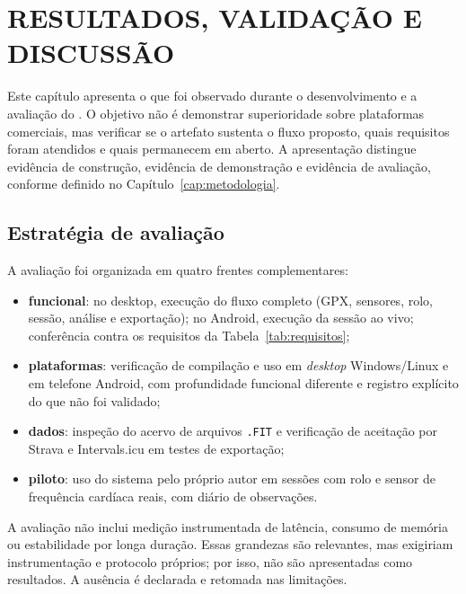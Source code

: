 
\chapter{RESULTADOS, VALIDAÇÃO E DISCUSSÃO}
\label{cap:resultados}

Este capítulo apresenta o que foi observado durante o desenvolvimento e a
avaliação do \argus{}. O objetivo não é demonstrar superioridade sobre
plataformas comerciais, mas verificar se o artefato sustenta o fluxo proposto,
quais requisitos foram atendidos e quais permanecem em aberto. A apresentação
distingue evidência de construção, evidência de demonstração e evidência de
avaliação, conforme definido no Capítulo~\ref{cap:metodologia}.

\section{Estratégia de avaliação}
\label{sec:estrategia-avaliacao}

A avaliação foi organizada em quatro frentes complementares:

\begin{itemize}
    \item \textbf{funcional}: no desktop, execução do fluxo completo (GPX,
        sensores, rolo, sessão, análise e exportação); no Android, execução
        da sessão ao vivo; conferência contra os requisitos da
        Tabela~\ref{tab:requisitos};
    \item \textbf{plataformas}: verificação de compilação e uso em
        \textit{desktop} Windows/Linux e em telefone Android, com profundidade
        funcional diferente e registro explícito do que não foi validado;
    \item \textbf{dados}: inspeção do acervo de arquivos \texttt{.FIT} e
        verificação de aceitação por Strava e Intervals.icu em testes de
        exportação;
    \item \textbf{piloto}: uso do sistema pelo próprio autor em sessões com
        rolo e sensor de frequência cardíaca reais, com diário de observações.
\end{itemize}

A avaliação não inclui medição instrumentada de latência, consumo de memória ou
estabilidade por longa duração. Essas grandezas são relevantes, mas exigiriam
instrumentação e protocolo próprios; por isso, não são apresentadas como
resultados. A ausência é declarada e retomada nas limitações.

